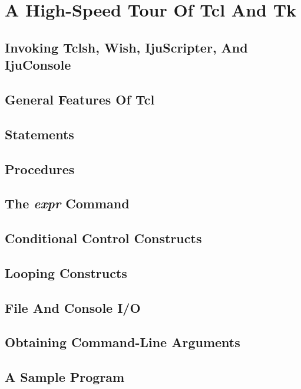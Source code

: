 \section{A High-Speed Tour Of Tcl And Tk}

\subsection{Invoking Tclsh, Wish, IjuScripter, And IjuConsole}

\subsection{General Features Of Tcl}

\subsection{Statements}

\subsection{Procedures}

\subsection{The \emph{expr} Command}

\subsection{Conditional Control Constructs}

\subsection{Looping Constructs}

\subsection{File And Console I/O}

\subsection{Obtaining Command-Line Arguments}

\subsection{A Sample Program}


